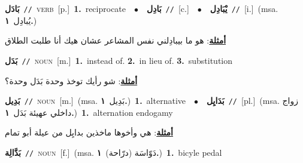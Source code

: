 \documentclass[10pt,a4paper,twoside]{article} %
\begin{document}
\begin{multicols}{2}
{\setlength\topsep{0pt}\textbf{\foreignlanguage{arabic}{بَادَل}}\ {\color{gray}\texttt{//}\color{black}}\ \textsc{verb}\ [p.]\ \textbf{1.}~reciprocate\ \ $\bullet$\ \ \setlength\topsep{0pt}\textbf{\foreignlanguage{arabic}{بَادِل}}\ {\color{gray}\texttt{//}\color{black}}\ [c.]\ \ $\bullet$\ \ \setlength\topsep{0pt}\textbf{\foreignlanguage{arabic}{يْبَادِل}}\ {\color{gray}\texttt{//}\color{black}}\ [i.]\ \color{gray}(msa. \foreignlanguage{arabic}{يُبادِل}~\foreignlanguage{arabic}{\textbf{١.}})\color{black}\  \begin{flushright}\color{gray}\foreignlanguage{arabic}{\textbf{\underline{\foreignlanguage{arabic}{أمثلة}}}: هو ما بيبادِلني نفس المشاعر عشان هيك أنا طلبت الطلاق}\end{flushright}\color{black}} \vspace{2mm}

{\setlength\topsep{0pt}\textbf{\foreignlanguage{arabic}{بَدَل}}\ {\color{gray}\texttt{//}\color{black}}\ \textsc{noun}\ [m.]\ \textbf{1.}~instead of.  \textbf{2.}~in lieu of.  \textbf{3.}~substitution\  \begin{flushright}\color{gray}\foreignlanguage{arabic}{\textbf{\underline{\foreignlanguage{arabic}{أمثلة}}}: شو رأيك توخذ وحدة بَدَل وحدة؟}\end{flushright}\color{black}} \vspace{2mm}

{\setlength\topsep{0pt}\textbf{\foreignlanguage{arabic}{بَدِيل}}\ {\color{gray}\texttt{//}\color{black}}\ \textsc{noun}\ [m.]\ \color{gray}(msa. \foreignlanguage{arabic}{بَدِيل}~\foreignlanguage{arabic}{\textbf{١.}})\color{black}\ \textbf{1.}~alternative\ \ $\bullet$\ \ \setlength\topsep{0pt}\textbf{\foreignlanguage{arabic}{بَدَايِل}}\ {\color{gray}\texttt{//}\color{black}}\ [pl.]\ \color{gray}(msa. \foreignlanguage{arabic}{زواج داخلي عهيئة بَدَل}~\foreignlanguage{arabic}{\textbf{١.}})\color{black}\ \textbf{1.}~alternation endogamy\  \begin{flushright}\color{gray}\foreignlanguage{arabic}{\textbf{\underline{\foreignlanguage{arabic}{أمثلة}}}: هي وأخوها ماخذين بدايِل من عيلة أبو تمام}\end{flushright}\color{black}} \vspace{2mm}

{\setlength\topsep{0pt}\textbf{\foreignlanguage{arabic}{بَدَّالِة}}\ {\color{gray}\texttt{//}\color{black}}\ \textsc{noun}\ [f.]\ \color{gray}(msa. \foreignlanguage{arabic}{دَوّاسَة (درّاحة)}~\foreignlanguage{arabic}{\textbf{١.}})\color{black}\ \textbf{1.}~bicyle pedal\ } \vspace{2mm}


\end{multicols}
\end{document}
